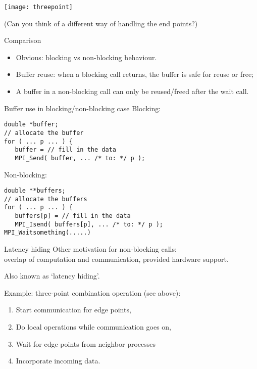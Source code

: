 \begin{exerciseframe}[isendirecv]
  
  
  \texttt{[image: threepoint]}

  (Can you think of a different way of handling the end points?)
\end{exerciseframe}

\begin{numberedframe}{Comparison}
  \begin{itemize}
  \item Obvious: blocking vs non-blocking behaviour.
  \item Buffer reuse: when a blocking call returns, the buffer
    is safe for reuse or free;
  \item A buffer in a non-blocking call can only be reused/freed
    after the wait call.
  \end{itemize}
\end{numberedframe}

\begin{numberedframe}{Buffer use in blocking/non-blocking case}
Blocking:
\lstset{language=C}
\begin{lstlisting}
double *buffer;
// allocate the buffer
for ( ... p ... ) {
   buffer = // fill in the data
   MPI_Send( buffer, ... /* to: */ p );
\end{lstlisting}
Non-blocking:
\begin{lstlisting}
double **buffers;
// allocate the buffers
for ( ... p ... ) {
   buffers[p] = // fill in the data
   MPI_Isend( buffers[p], ... /* to: */ p );
MPI_Waitsomething(.....)
\end{lstlisting}
\end{numberedframe}

\begin{numberedframe}{Latency hiding}
  Other motivation for non-blocking calls:\\
  overlap of computation and communication, provided
  hardware support.

  Also known as `latency hiding'.

  Example: three-point combination operation (see above):
  \begin{enumerate}
  \item Start communication for edge points,
  \item Do local operations while communication goes on,
  \item Wait for edge points from neighbor processes
  \item Incorporate incoming data.
  \end{enumerate}
\end{numberedframe}

